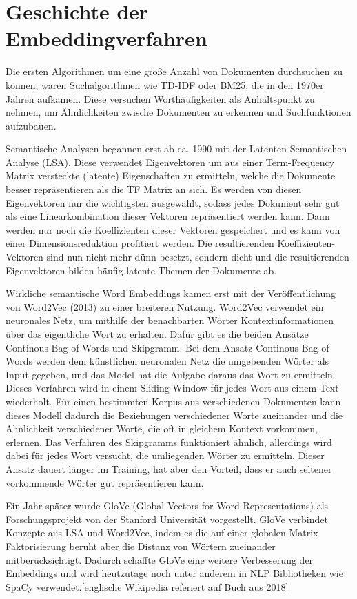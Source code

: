\section{Geschichte der Embeddingverfahren}

Die ersten Algorithmen um eine große Anzahl von Dokumenten durchsuchen zu können, waren Suchalgorithmen wie TD-IDF oder BM25, die in den 1970er Jahren aufkamen.
Diese versuchen Worthäufigkeiten als Anhaltspunkt zu nehmen, um Ähnlichkeiten zwische Dokumenten zu erkennen und Suchfunktionen aufzubauen. 

Semantische Analysen begannen erst ab ca. 1990 mit der Latenten Semantischen Analyse (LSA).
Diese verwendet Eigenvektoren um aus einer Term-Frequency Matrix versteckte (latente) Eigenschaften zu ermitteln, welche die Dokumente besser repräsentieren als die TF Matrix an sich. 
Es werden von diesen Eigenvektoren nur die wichtigsten ausgewählt, sodass jedes Dokument sehr gut als eine Linearkombination dieser Vektoren repräsentiert werden kann.
Dann werden nur noch die Koeffizienten dieser Vektoren gespeichert und es kann von einer Dimensionsreduktion profitiert werden.
Die resultierenden Koeffizienten-Vektoren sind nun nicht mehr dünn besetzt, sondern dicht und die resultierenden Eigenvektoren bilden häufig latente Themen der Dokumente ab.

Wirkliche semantische Word Embeddings kamen erst mit der Veröffentlichung von Word2Vec (2013) zu einer breiteren Nutzung. 
Word2Vec verwendet ein neuronales Netz, um mithilfe der benachbarten Wörter Kontextinformationen über das eigentliche Wort zu erhalten. 
Dafür gibt es die beiden Ansätze Continous Bag of Words und Skipgramm.
Bei dem Ansatz Continous Bag of Words werden dem künstlichen neuronalen Netz die umgebenden Wörter als Input gegeben, und das Model hat die Aufgabe daraus das Wort zu ermitteln. 
Dieses Verfahren wird in einem Sliding Window für jedes Wort aus einem Text wiederholt. 
Für einen bestimmten Korpus aus verschiedenen Dokumenten kann dieses Modell dadurch die Beziehungen verschiedener Worte zueinander und die Ähnlichkeit verschiedener Worte, die oft in gleichem Kontext vorkommen, erlernen. 
Das Verfahren des Skipgramms funktioniert ähnlich, allerdings wird dabei für jedes Wort versucht, die umliegenden Wörter zu ermitteln. 
Dieser Ansatz dauert länger im Training, hat aber den Vorteil, dass er auch seltener vorkommende Wörter gut repräsentieren kann.

Ein Jahr später wurde GloVe (Global Vectors for Word Representations) als Forschungsprojekt von der Stanford Universität vorgestellt.
GloVe verbindet Konzepte aus LSA und Word2Vec, indem es die auf einer globalen Matrix Faktorisierung beruht aber die Distanz von Wörtern zueinander mitberücksichtigt.
Dadurch schaffte GloVe eine weitere Verbesserung der Embeddings und wird heutzutage noch unter anderem in NLP Bibliotheken wie SpaCy verwendet.[englische Wikipedia referiert auf Buch aus 2018]

